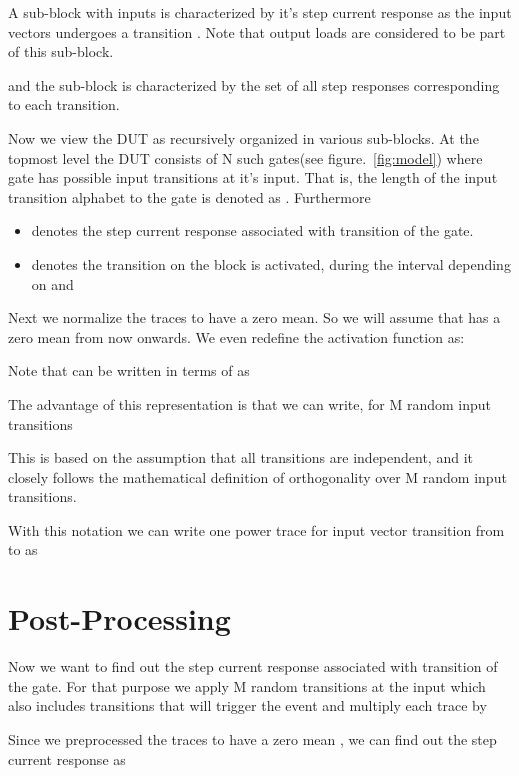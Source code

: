 \documentclass[a4]{IEEEtran}
\begin{document}
A sub-block with  inputs is characterized by it's step current response as the input vectors undergoes a transition . Note that output loads
are considered to be part of this sub-block.


and the sub-block is characterized by the set of all step responses corresponding to each transition.



Now we view the DUT as recursively organized in various sub-blocks. At the topmost level the DUT consists of N such gates(see figure.~\ref{fig:model}) 
where  gate has  possible input transitions at it's input. That is, the length of the input transition alphabet to the  gate is 
denoted as . Furthermore 
\begin{itemize}
\item
 denotes the step current response  associated with  
transition of the  gate. 
\item
 denotes the  transition on the  block is activated, during the interval depending on  and 
\end{itemize}

Next we normalize the traces to have a zero mean. So we will assume that  has a zero mean from now onwards.
We even redefine the activation function as:
\small

\normalsize
Note that  can be written in terms of  as 


The advantage of this representation is that we can write, for M random input transitions


This is based on the assumption that all transitions are independent, and it closely follows the mathematical
definition of orthogonality over M random input transitions.

With this notation we can write one power trace for input vector transition from  to  as 




\section{Post-Processing}
Now we want to find out the step current response associated with  transition of the  gate. For that purpose we 
apply M random transitions  at the input which also includes transitions that will trigger the event  
and multiply each trace by 
\small

\normalsize

Since we preprocessed the traces to have a zero mean , we can find out the step current response as
\end{document}
